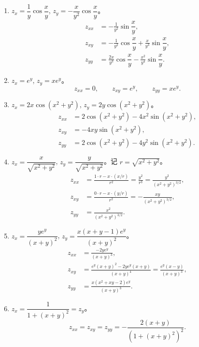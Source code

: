 \documentclass[lang=cn,11pt]{elegantbook}
\begin{document}
\begin{solution}
\begin{enumerate}
  \item[(1)] $z_x = \dfrac{1}{y}\cos\dfrac{x}{y}$, \quad $z_y = -\dfrac{x}{y^2}\cos\dfrac{x}{y}$。
  \begin{align*}
  z_{xx} &= -\frac{1}{y^2}\sin\dfrac{x}{y},\\
  z_{xy} &= -\frac{1}{y^2}\cos\dfrac{x}{y} + \frac{x}{y^3}\sin\dfrac{x}{y},\\
  z_{yy} &= \frac{2x}{y^3}\cos\dfrac{x}{y} - \frac{x^2}{y^4}\sin\dfrac{x}{y}.
  \end{align*}

  \item[(2)] $z_x = e^y$, \quad $z_y = xe^y$。
  \[
  z_{xx} = 0, \qquad z_{xy} = e^y, \qquad z_{yy} = xe^y.
  \]

  \item[(3)] $z_x = 2x\cos(x^2+y^2)$, \quad $z_y = 2y\cos(x^2+y^2)$。
  \begin{align*}
  z_{xx} &= 2\cos(x^2+y^2) - 4x^2\sin(x^2+y^2),\\
  z_{xy} &= -4xy\sin(x^2+y^2),\\
  z_{yy} &= 2\cos(x^2+y^2) - 4y^2\sin(x^2+y^2).
  \end{align*}

  \item[(4)] $z_x = \dfrac{x}{\sqrt{x^2+y^2}}$, \quad $z_y = \dfrac{y}{\sqrt{x^2+y^2}}$。记 $r = \sqrt{x^2+y^2}$。
  \begin{align*}
  z_{xx} &= \frac{1\cdot r - x\cdot(x/r)}{r^2} = \frac{y^2}{r^3} = \frac{y^2}{(x^2+y^2)^{3/2}},\\
  z_{xy} &= \frac{0\cdot r - x\cdot(y/r)}{r^2} = -\frac{xy}{(x^2+y^2)^{3/2}},\\
  z_{yy} &= \frac{x^2}{(x^2+y^2)^{3/2}}.
  \end{align*}

  \item[(5)] $z_x = \dfrac{y e^y}{(x+y)^2}$, \quad $z_y = \dfrac{x(x+y-1)e^y}{(x+y)^2}$。
  \begin{align*}
  z_{xx} &= \frac{-2y e^y}{(x+y)^3},\\
  z_{xy} &= \frac{e^y(x+y)^2 - 2y e^y(x+y)}{(x+y)^4} = \frac{e^y(x-y)}{(x+y)^3},\\
  z_{yy} &= \frac{x(x^2+xy-2)e^y}{(x+y)^3}.
  \end{align*}

  \item[(6)] $z_x = \dfrac{1}{1+(x+y)^2} = z_y$。
  \[
  z_{xx} = z_{xy} = z_{yy} = -\frac{2(x+y)}{(1+(x+y)^2)^2}.
  \]


\end{enumerate}
\end{solution}
\end{document}
